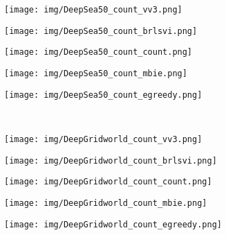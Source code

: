 \documentclass{article}
\begin{document}
\begin{figure}[t]
	\centering 
	\begin{subfigure}[b]{.18\linewidth} 
		\centering 
		\texttt{[image: img/DeepSea50\_count\_vv3.png]}
	\end{subfigure}
	\hfill
	\begin{subfigure}[b]{.18\linewidth} 
		\centering 
		\texttt{[image: img/DeepSea50\_count\_brlsvi.png]}
	\end{subfigure} 
	\hfill
	\begin{subfigure}[b]{.18\linewidth} 
		\centering 
		\texttt{[image: img/DeepSea50\_count\_count.png]}
	\end{subfigure}
	\hfill
	\begin{subfigure}[b]{.18\linewidth} 
		\centering 
		\texttt{[image: img/DeepSea50\_count\_mbie.png]}
	\end{subfigure} 
	\hfill
	\begin{subfigure}[b]{.18\linewidth} 
		\centering 
		\texttt{[image: img/DeepSea50\_count\_egreedy.png]}
	\end{subfigure} 
	\\[0.5em]
	\begin{subfigure}[b]{.18\linewidth} 
		\centering 
		\texttt{[image: img/DeepGridworld\_count\_vv3.png]}
	\end{subfigure}
	\hfill
	\begin{subfigure}[b]{.18\linewidth} 
		\centering 
		\texttt{[image: img/DeepGridworld\_count\_brlsvi.png]}
	\end{subfigure} 
	\hfill
	\begin{subfigure}[b]{.18\linewidth} 
		\centering 
		\texttt{[image: img/DeepGridworld\_count\_count.png]}
	\end{subfigure}
	\hfill
	\begin{subfigure}[b]{.18\linewidth} 
		\centering 
		\texttt{[image: img/DeepGridworld\_count\_mbie.png]}
	\end{subfigure} 
	\hfill
	\begin{subfigure}[b]{.18\linewidth} 
		\centering 
		\texttt{[image: img/DeepGridworld\_count\_egreedy.png]}

\end{subfigure}
\end{figure}
\end{document}
